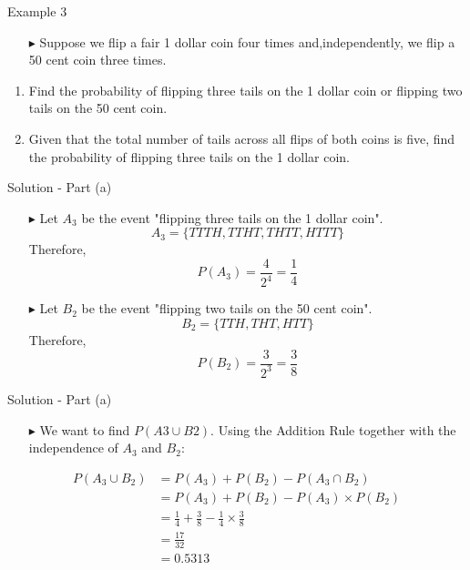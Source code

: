 \documentclass[12pt]{beamer}
\begin{document}
\begin{frame}{Example 3}
	\begin{itemize}
		\item[\color{blue}$\blacktriangleright$] Suppose we flip a fair 1 dollar coin four times and,independently, we flip a 50 cent coin three times.
	\end{itemize}
	\begin{enumerate}[label=\textcolor{blue}{(\alph*)}]
		\item Find the probability of flipping three tails on the 1 dollar coin or flipping two tails on the 50 cent coin.
		\item Given that the total number of tails across all flips of both coins is five, find the probability of flipping three tails on the 1 dollar coin.
	\end{enumerate}
	
\end{frame}
\begin{frame}{Solution - Part (a)}
	\begin{itemize}
	\item[\color{blue}$\blacktriangleright$] Let $A_3$ be the event "flipping three tails on the 1 dollar coin".
	$$A_3=\{TTTH,TTHT,THTT,HTTT\}$$
	Therefore,
	$$P(A_3)=\frac{4}{2^4}=\frac{1}{4}$$
	\item[\color{blue}$\blacktriangleright$] Let $B_2$ be the event "flipping two tails on the 50 cent coin".
	$$B_2=\{TTH,THT,HTT\}$$
	Therefore,
	$$P(B_2)=\frac{3}{2^3}=\frac{3}{8}$$
\end{itemize}
\end{frame}
\begin{frame}{Solution - Part (a)}
	\begin{itemize}
		\item[\color{blue}$\blacktriangleright$] We want to find $P(A3\cup B2)$. Using the Addition Rule together with the independence of $A_3$ and $B_2$:
			\end{itemize}
\begin{align*}
	P(A_3 \cup B_2) &= P(A_3) + P(B_2) - P(A_3 \cap B_2) \\
	&= P(A_3) + P(B_2) - P(A_3) \times P(B_2) \\
	&= \frac{1}{4} + \frac{3}{8} - \frac{1}{4} \times \frac{3}{8} \\
	&= \frac{17}{32} \\
	&= 0.5313
\end{align*}

\end{frame}
\end{document}
